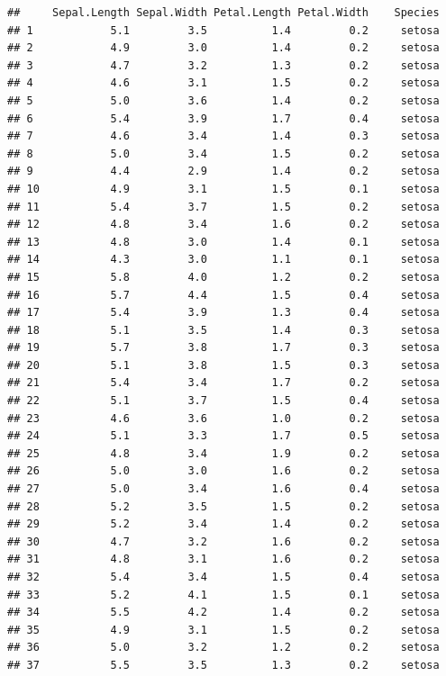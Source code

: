 \documentclass[
]{article}
\begin{document}
\begin{verbatim}
##     Sepal.Length Sepal.Width Petal.Length Petal.Width    Species
## 1            5.1         3.5          1.4         0.2     setosa
## 2            4.9         3.0          1.4         0.2     setosa
## 3            4.7         3.2          1.3         0.2     setosa
## 4            4.6         3.1          1.5         0.2     setosa
## 5            5.0         3.6          1.4         0.2     setosa
## 6            5.4         3.9          1.7         0.4     setosa
## 7            4.6         3.4          1.4         0.3     setosa
## 8            5.0         3.4          1.5         0.2     setosa
## 9            4.4         2.9          1.4         0.2     setosa
## 10           4.9         3.1          1.5         0.1     setosa
## 11           5.4         3.7          1.5         0.2     setosa
## 12           4.8         3.4          1.6         0.2     setosa
## 13           4.8         3.0          1.4         0.1     setosa
## 14           4.3         3.0          1.1         0.1     setosa
## 15           5.8         4.0          1.2         0.2     setosa
## 16           5.7         4.4          1.5         0.4     setosa
## 17           5.4         3.9          1.3         0.4     setosa
## 18           5.1         3.5          1.4         0.3     setosa
## 19           5.7         3.8          1.7         0.3     setosa
## 20           5.1         3.8          1.5         0.3     setosa
## 21           5.4         3.4          1.7         0.2     setosa
## 22           5.1         3.7          1.5         0.4     setosa
## 23           4.6         3.6          1.0         0.2     setosa
## 24           5.1         3.3          1.7         0.5     setosa
## 25           4.8         3.4          1.9         0.2     setosa
## 26           5.0         3.0          1.6         0.2     setosa
## 27           5.0         3.4          1.6         0.4     setosa
## 28           5.2         3.5          1.5         0.2     setosa
## 29           5.2         3.4          1.4         0.2     setosa
## 30           4.7         3.2          1.6         0.2     setosa
## 31           4.8         3.1          1.6         0.2     setosa
## 32           5.4         3.4          1.5         0.4     setosa
## 33           5.2         4.1          1.5         0.1     setosa
## 34           5.5         4.2          1.4         0.2     setosa
## 35           4.9         3.1          1.5         0.2     setosa
## 36           5.0         3.2          1.2         0.2     setosa
## 37           5.5         3.5          1.3         0.2     setosa

\end{verbatim}
\end{document}
